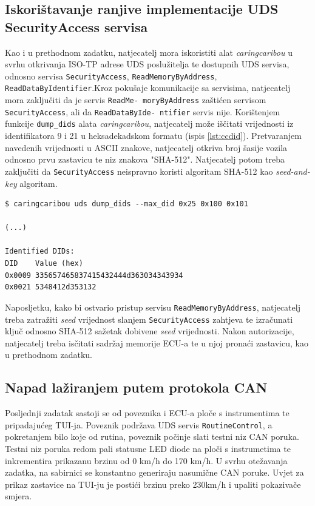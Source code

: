 \documentclass[times, utf8, diplomski, numeric]{fer}
\begin{document}
\subsection{Iskorištavanje ranjive implementacije UDS SecurityAccess servisa}
Kao i u prethodnom zadatku, natjecatelj mora iskoristiti alat \textit{caringcaribou} u svrhu otkrivanja ISO-TP adrese UDS poslužitelja te dostupnih UDS servisa, odnosno servisa \texttt{SecurityAccess}, \texttt{ReadMemoryByAddress}, \texttt{ReadDataByIdentifier}.Kroz pokušaje komunikacije sa servisima, natjecatelj mora zaključiti da je servis \texttt{ReadMe- moryByAddress} zaštićen servisom \texttt{SecurityAccess}, ali da \texttt{ReadDataByIde- ntifier} servis nije. Korištenjem funkcije \texttt{dump\_dids} alata \textit{caringcaribou}, natjecatelj može iščitati vrijednosti iz identifikatora 9 i 21 u heksadekadskom formatu (ispis \ref{lst:ccdid}). Pretvaranjem navedenih vrijednosti u ASCII znakove, natjecatelj otkriva broj šasije vozila odnosno prvu zastavicu te niz znakova "SHA-512". Natjecatelj potom treba zaključiti da \texttt{SecurityAccess} neispravno koristi algoritam SHA-512 kao \textit{seed-and-key} algoritam.
\bigskip
\begin{lstlisting}[style=terminal, label={lst:ccdid},caption={Dodavanje ECU-a}]
$ caringcaribou uds dump_dids --max_did 0x25 0x100 0x101

(...)

Identified DIDs:
DID    Value (hex)
0x0009 335657465837415432444d363034343934
0x0021 5348412d353132

\end{lstlisting}

Naposljetku, kako bi ostvario pristup servisu \texttt{ReadMemoryByAddress}, natjecatelj treba zatražiti \textit{seed} vrijednost slanjem \texttt{SecurityAccess} zahtjeva te izračunati ključ odnosno SHA-512 sažetak dobivene \textit{seed} vrijednosti. Nakon autorizacije, natjecatelj treba isčitati sadržaj memorije ECU-a te u njoj pronaći zastavicu, kao u prethodnom zadatku. 

\subsection{Napad lažiranjem putem protokola CAN}
Posljednji zadatak sastoji se od poveznika i ECU-a ploče s instrumentima te pripadajućeg TUI-ja. Poveznik podržava UDS servis \texttt{RoutineControl}, a pokretanjem bilo koje od rutina, poveznik počinje slati testni niz CAN poruka. Testni niz poruka redom pali statusne LED diode na ploči s instrumetima te inkrementira prikazanu brzinu od 0 km/h do 170 km/h. U svrhu otežavanja zadatka, na sabirnici se konstantno generiraju nasumične CAN poruke. Uvjet za prikaz zastavice na TUI-ju je postići brzinu preko 230km/h i upaliti pokazivače smjera.
\end{document}

